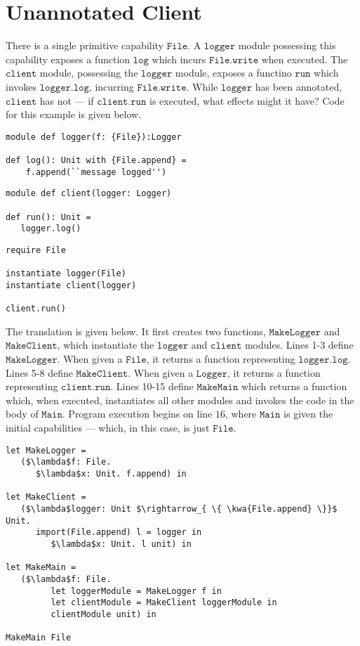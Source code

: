 \documentclass[sigplan,10pt,review]{acmart}\settopmatter{printfolios=true,printccs=false,printacmref=false}
\newcommand{\kwa}[1]{\mathtt{#1}}
\begin{document}
\section{Unannotated Client}

There is a single primitive capability $\kwa{File}$. A $\kwa{logger}$ module possessing this capability exposes a function $\kwa{log}$ which incurs $\kwa{File.write}$ when executed. The $\kwa{client}$ module, possessing the $\kwa{logger}$ module, exposes a functino $\kwa{run}$ which invokes $\kwa{logger.log}$, incurring $\kwa{File.write}$. While $\kwa{logger}$ has been annotated, $\kwa{client}$ has not --- if $\kwa{client.run}$ is executed, what effects might it have? Code for this example is given below. 

\begin{lstlisting}
module def logger(f: {File}):Logger

def log(): Unit with {File.append} =
    f.append(``message logged'')
\end{lstlisting}

\begin{lstlisting}
module def client(logger: Logger)

def run(): Unit =
   logger.log()
\end{lstlisting}

\begin{lstlisting}
require File

instantiate logger(File)
instantiate client(logger)

client.run()
\end{lstlisting}

The translation is given below. It first creates two functions, $\kwa{MakeLogger}$ and $\kwa{MakeClient}$, which instantiate the $\kwa{logger}$ and $\kwa{client}$ modules. Lines 1-3 define $\kwa{MakeLogger}$. When given a $\kwa{File}$, it returns a function representing $\kwa{logger.log}$. Lines 5-8 define $\kwa{MakeClient}$. When given a $\kwa{Logger}$, it returns a function representing $\kwa{client.run}$. Lines 10-15 define $\kwa{MakeMain}$ which returns a function which, when executed, instantiates all other modules and invokes the code in the body of $\kwa{Main}$. Program execution begins on line $16$, where $\kwa{Main}$ is given the initial capabilities --- which, in this case, is just $\kwa{File}$.

\begin{lstlisting}
let MakeLogger =
   ($\lambda$f: File.
      $\lambda$x: Unit. f.append) in
          
let MakeClient =
   ($\lambda$logger: Unit $\rightarrow_{ \{ \kwa{File.append} \}}$ Unit.
      import(File.append) l = logger in
         $\lambda$x: Unit. l unit) in
          
let MakeMain =
   ($\lambda$f: File.
         let loggerModule = MakeLogger f in
         let clientModule = MakeClient loggerModule in
         clientModule unit) in

MakeMain File
\end{lstlisting}
\end{document}
